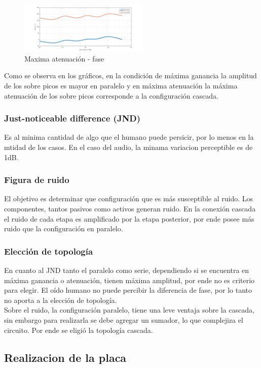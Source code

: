 \documentclass[../../tc_tp3_main.tex]{subfiles}
\begin{document}
\begin{figure}[H]
\centering
\includegraphics[width=0.55\textwidth]{imagenes/parCasSimMin_f.png}
\caption{Maxima atenuación - fase} 
\end{figure}

Como se observa en los gráficos, en la condición de máxima ganancia la amplitud de los sobre picos es mayor en paralelo y en máxima atenuación la máxima atenuación de los sobre picos corresponde a la configuración cascada.


\subsubsection{Just-noticeable difference (JND)}
Es al minima cantidad de algo que el humano puede persicir, por lo menos en la mtidad de los casos. En el caso del audio, la minama variacion perceptible es de 1dB.
\subsubsection{Figura de ruido}
El objetivo es determinar que configuración que es más susceptible al ruido. Los componentes, tantos pasivos como activos generan ruido. En  la conexión cascada el ruido de cada etapa es amplificado por la etapa posterior, por ende posee más ruido que la configuración en paralelo.

\subsubsection{Elección de topología}

En cuanto al JND tanto el paralelo como  serie, dependiendo si se encuentra en máxima ganancia o atenuación, tienen máxima amplitud, por ende no es criterio para elegir. El oído humano no puede percibir la diferencia de fase, por lo tanto no aporta a la elección de topología.
\\Sobre el ruido, la configuración paralelo, tiene una leve ventaja sobre la cascada, sin embargo para realizarla se debe agregar un sumador, lo que complejiza el circuito. Por ende se eligió la topología cascada.

\subsection{Realizacion de la placa}
\end{document}
